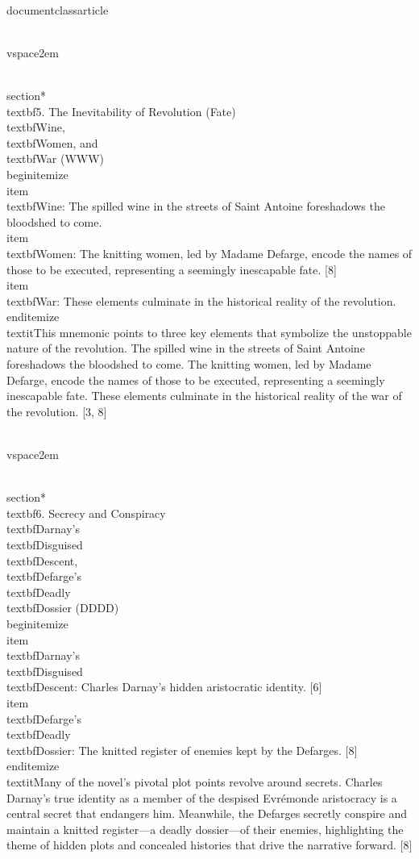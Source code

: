 \\documentclass{article}
\begin{document}
\\vspace{2em}

\\section*{\\textbf{5. The Inevitability of Revolution (Fate)}}
\\textbf{W}ine, \\textbf{W}omen, and \\textbf{W}ar (WWW)
\\begin{itemize}
    \\item \\textbf{W}ine: The spilled wine in the streets of Saint Antoine foreshadows the bloodshed to come.
    \\item \\textbf{W}omen: The knitting women, led by Madame Defarge, encode the names of those to be executed, representing a seemingly inescapable fate. [8]
    \\item \\textbf{W}ar: These elements culminate in the historical reality of the revolution.
\\end{itemize}
\\textit{This mnemonic points to three key elements that symbolize the unstoppable nature of the revolution. The spilled wine in the streets of Saint Antoine foreshadows the bloodshed to come. The knitting women, led by Madame Defarge, encode the names of those to be executed, representing a seemingly inescapable fate. These elements culminate in the historical reality of the war of the revolution. [3, 8]}

\\vspace{2em}

\\section*{\\textbf{6. Secrecy and Conspiracy}}
\\textbf{D}arnay's \\textbf{D}isguised \\textbf{D}escent, \\textbf{D}efarge's \\textbf{D}eadly \\textbf{D}ossier (DDDD)
\\begin{itemize}
    \\item \\textbf{D}arnay's \\textbf{D}isguised \\textbf{D}escent: Charles Darnay's hidden aristocratic identity. [6]
    \\item \\textbf{D}efarge's \\textbf{D}eadly \\textbf{D}ossier: The knitted register of enemies kept by the Defarges. [8]
\\end{itemize}
\\textit{Many of the novel's pivotal plot points revolve around secrets. Charles Darnay's true identity as a member of the despised Evrémonde aristocracy is a central secret that endangers him. Meanwhile, the Defarges secretly conspire and maintain a knitted register—a deadly dossier—of their enemies, highlighting the theme of hidden plots and concealed histories that drive the narrative forward. [8]}

\
\end{document}
